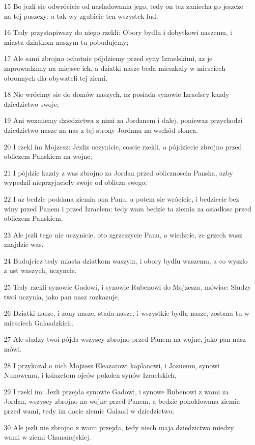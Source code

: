 \par 15 Bo jezli sie odwrócicie od nasladowania jego, tedy on tez zaniecha go jeszcze na tej puszczy; a tak wy zgubicie ten wszystek lud.
\par 16 Tedy przystapiwszy do niego rzekli: Obory bydlu i dobytkowi naszemu, i miasta dziatkom naszym tu pobudujemy;
\par 17 Ale sami zbrojno ochotnie pójdziemy przed syny Izraelskimi, az je zaprowadzimy na miejsce ich, a dziatki nasze beda mieszkaly w miesciech obronnych dla obywateli tej ziemi.
\par 18 Nie wrócimy sie do domów naszych, az posiada synowie Izraelscy kazdy dziedzictwo swoje;
\par 19 Ani wezmiemy dziedzictwa z nimi za Jordanem i dalej, poniewaz przychodzi dziedzictwo nasze na nas z tej strony Jordanu na wschód slonca.
\par 20 I rzekl im Mojzesz: Jezliz uczynicie, coscie rzekli, a pójdziecie zbrojno przed obliczem Panskiem na wojne;
\par 21 I pójdzie kazdy z was zbrojno za Jordan przed oblicznoscia Panska, azby wypedzil nieprzyjacioly swoje od oblicza swego;
\par 22 I az bedzie poddana ziemia ona Panu, a potem sie wrócicie, i bedziecie bez winy przed Panem i przed Izraelem: tedy wam bedzie ta ziemia za osiadlosc przed obliczem Panskiem.
\par 23 Ale jezli tego nie uczynicie, oto zgrzeszycie Panu, a wiedzcie, ze grzech wasz znajdzie was.
\par 24 Budujciez tedy miasta dziatkom waszym, i obory bydlu waszemu, a co wyszlo z ust waszych, uczyncie.
\par 25 Tedy rzekli synowie Gadowi, i synowie Rubenowi do Mojzesza, mówiac: Sludzy twoi uczynia, jako pan nasz rozkazuje.
\par 26 Dziatki nasze, i zony nasze, stada nasze, i wszystkie bydla nasze, zostana tu w miesciech Galaadzkich;
\par 27 Ale sludzy twoi pójda wszyscy zbrojno przed Panem na wojne, jako pan nasz mówi.
\par 28 I przykazal o nich Mojzesz Eleazarowi kaplanowi, i Jozuemu, synowi Nunowemu, i ksiazetom ojców pokolen synów Izraelskich,
\par 29 I rzekl im: Jezli przejda synowie Gadowi, i synowe Rubenowi z wami za Jordan, wszyscy zbrojno na wojne przed Panem, a bedzie poholdowana ziemia przed wami, tedy im dacie ziemie Galaad w dziedzictwo;
\par 30 Ale jezli nie zbrojno z wami przejda, tedy niech maja dziedzictwo miedzy wami w ziemi Chananejskiej.
